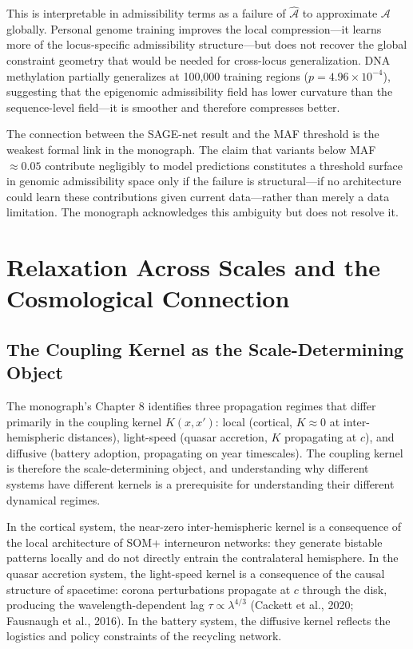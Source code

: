 \documentclass[12pt, a4paper]{article}
\theoremstyle{definition}
\begin{document}
This is interpretable in admissibility terms as a failure of $\hat{\mathcal{A}}$ to approximate $\mathcal{A}$ globally. Personal genome training improves the local compression---it learns more of the locus-specific admissibility structure---but does not recover the global constraint geometry that would be needed for cross-locus generalization. DNA methylation partially generalizes at 100,000 training regions ($p = 4.96 \times 10^{-4}$), suggesting that the epigenomic admissibility field has lower curvature than the sequence-level field---it is smoother and therefore compresses better.

The connection between the SAGE-net result and the MAF threshold is the weakest formal link in the monograph. The claim that variants below MAF $\approx 0.05$ contribute negligibly to model predictions constitutes a threshold surface in genomic admissibility space only if the failure is structural---if no architecture could learn these contributions given current data---rather than merely a data limitation. The monograph acknowledges this ambiguity but does not resolve it.

\section{Relaxation Across Scales and the Cosmological Connection}

\subsection{The Coupling Kernel as the Scale-Determining Object}

The monograph's Chapter 8 identifies three propagation regimes that differ primarily in the coupling kernel $K(x,x')$: local (cortical, $K \approx 0$ at inter-hemispheric distances), light-speed (quasar accretion, $K$ propagating at $c$), and diffusive (battery adoption, propagating on year timescales). The coupling kernel is therefore the scale-determining object, and understanding why different systems have different kernels is a prerequisite for understanding their different dynamical regimes.

In the cortical system, the near-zero inter-hemispheric kernel is a consequence of the local architecture of SOM+ interneuron networks: they generate bistable patterns locally and do not directly entrain the contralateral hemisphere. In the quasar accretion system, the light-speed kernel is a consequence of the causal structure of spacetime: corona perturbations propagate at $c$ through the disk, producing the wavelength-dependent lag $\tau \propto \lambda^{4/3}$ (Cackett et al., 2020; Fausnaugh et al., 2016). In the battery system, the diffusive kernel reflects the logistics and policy constraints of the recycling network.
\end{document}
